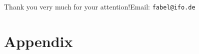 \documentclass[aspectratio=169,handout]{beamer} %
\begin{document}
\begin{frame}
\begin{center}
Thank you very much for your attention!\newline Email: \texttt{fabel@ifo.de}
\end{center}




\end{frame}



\section*{Appendix}
\end{document}
